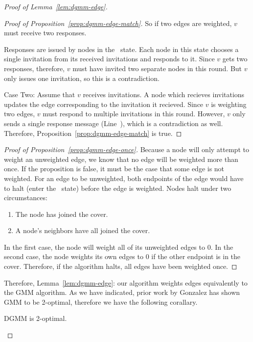 \begin{proof}[Proof of Lemma~\ref{lem:dgmm-edge}]
\begin{proof}[Proof of Proposition~\ref{prop:dgmm-edge-match}]
    So if two edges are weighted, $v$ must receive two responses.

    Responses are issued by nodes in the \cRd\ state. Each node in this state chooses a single invitation from its received invitations and responds to it. Since $v$ gets two responses, therefore, $v$ must have invited two separate nodes in this round. But $v$ only issues one invitation, so this is a contradiction.

    Case Two: Assume that $v$ receives invitations. A node which recieves invitations updates the edge corresponding to the invitation it recieved. Since $v$ is weighting two edges, $v$ must respond to multiple invitations in this round. However, $v$ only sends a single response message (Line~), which is a contradiction as well.
    Therefore, Proposition~\ref{prop:dgmm-edge-match} is true.
  \end{proof}
  \begin{proof}[Proof of Proposition~\ref{prop:dgmm-edge-once}]
    Because a node will only attempt to weight an unweighted edge, we know that no edge will be weighted more than once. If the proposition is false, it must be the case that some edge is not weighted.
    For an edge to be unweighted, both endpoints of the edge would have to halt (enter the \cDd\ state) before the edge is weighted. Nodes halt under two circumstances:
    \begin{enumerate}
    \item The node has joined the cover.
    \item A node's neighbors have all joined the cover.
    \end{enumerate}
    In the first case, the node will weight all of its unweighted edges to 0. In the second case, the node weights its own edges to 0 if the other endpoint is in the cover.
    Therefore, if the algorithm halts, all edges have been weighted once.
  \end{proof}
  Therefore, Lemma~\ref{lem:dgmm-edge}: our algorithm weights edges equivalently to the GMM algorithm. As we have indicated, prior work by Gonzalez has shown GMM to be 2-optimal, therefore we have the following corallary.
\begin{cor}\label{cor:dgmm-two}DGMM is 2-optimal.\end{cor}
\end{proof}
